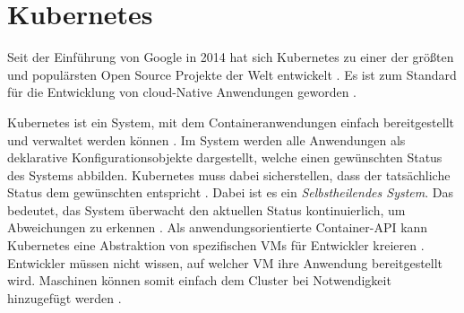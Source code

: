 \section{Kubernetes}
\label{sec:grundlagen:kubernetes}
Seit der Einführung von Google in 2014 hat sich Kubernetes zu einer der größten und populärsten 
Open Source Projekte der Welt entwickelt \cite{Burns2019}. Es ist zum Standard für die Entwicklung von cloud-Native 
Anwendungen geworden \cite{Burns2019}. 

Kubernetes ist ein System, mit dem Containeranwendungen einfach bereitgestellt und verwaltet werden können \cite{Marko2018}.
Im System werden alle Anwendungen als deklarative Konfigurationsobjekte dargestellt, welche einen gewünschten
Status des Systems abbilden. Kubernetes muss dabei sicherstellen, dass der tatsächliche Status dem gewünschten entspricht \cite{Burns2019}.
Dabei ist es ein \emph{Selbstheilendes System}.
Das bedeutet, das System überwacht den aktuellen Status kontinuierlich, um Abweichungen zu erkennen \cite{Burns2019}.
Als anwendungsorientierte Container-API kann Kubernetes eine Abstraktion von spezifischen \acp{VM} für Entwickler kreieren \cite{Burns2019}.
Entwickler müssen nicht wissen, auf welcher \ac{VM} ihre Anwendung bereitgestellt wird.
Maschinen können somit einfach dem Cluster bei Notwendigkeit hinzugefügt werden \cite{Burns2019}.